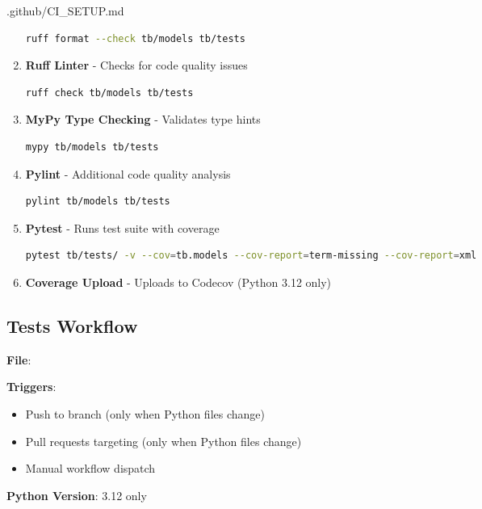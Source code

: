 \begin{relocated}{.github/CI_SETUP.md}
\begin{enumerate}
  \begin{lstlisting}[language=bash]
  ruff format --check tb/models tb/tests
  \end{lstlisting}
\item
  \textbf{Ruff Linter} - Checks for code quality issues

  \begin{lstlisting}[language=bash]
  ruff check tb/models tb/tests
  \end{lstlisting}
\item
  \textbf{MyPy Type Checking} - Validates type hints

  \begin{lstlisting}[language=bash]
  mypy tb/models tb/tests
  \end{lstlisting}
\item
  \textbf{Pylint} - Additional code quality analysis

  \begin{lstlisting}[language=bash]
  pylint tb/models tb/tests
  \end{lstlisting}
\item
  \textbf{Pytest} - Runs test suite with coverage

  \begin{lstlisting}[language=bash]
  pytest tb/tests/ -v --cov=tb.models --cov-report=term-missing --cov-report=xml
  \end{lstlisting}
\item
  \textbf{Coverage Upload} - Uploads to Codecov (Python 3.12 only)
\end{enumerate}

\subsection{Tests Workflow}\label{um:flow:ci-setup:tests-workflow}

\textbf{File}: 

\textbf{Triggers}:

\begin{itemize}
\tightlist
\item
  Push to  branch (only when Python files change)
\item
  Pull requests targeting  (only when Python files change)
\item
  Manual workflow dispatch
\end{itemize}

\textbf{Python Version}: 3.12 only


\end{relocated}
